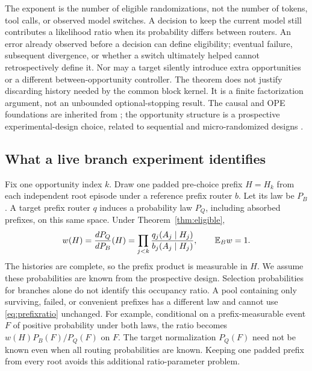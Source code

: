The exponent is the number of eligible randomizations, not the number of tokens, tool calls, or observed model switches. A decision to keep the current model still contributes a likelihood ratio when its probability differs between routers. An error already observed before a decision can define eligibility; eventual failure, subsequent divergence, or whether a switch ultimately helped cannot retrospectively define it. Nor may a target silently introduce extra opportunities or a different between-opportunity controller. The theorem does not justify discarding history needed by the common block kernel. It is a finite factorization argument, not an unbounded optional-stopping result. The causal and OPE foundations are inherited from \citet{robins1986new,jiang2016dr}; the opportunity structure is a prospective experimental-design choice, related to sequential and micro-randomized designs \citep{murphy2005smart,klasnja2015mrt}.

\subsection{What a live branch experiment identifies}
\label{sec:branches}

Fix one opportunity index $k$. Draw one padded pre-choice prefix $H=H_k$ from each independent root episode under a reference prefix router $b$. Let its law be $P_B$. A target prefix router $q$ induces a probability law $P_Q$, including absorbed prefixes, on this same space. Under Theorem~\ref{thm:eligible},
\begin{equation}
 w(H)=\frac{dP_Q}{dP_B}(H)
 =\prod_{j<k}\frac{q_j(A_j\mid H_j)}{b_j(A_j\mid H_j)},
 \qquad \mathbb{E}_Bw=1.
 \label{eq:prefixratio}
\end{equation}
The histories are complete, so the prefix product is measurable in $H$. We assume these probabilities are known from the prospective design. Selection probabilities for branches alone do not identify this occupancy ratio. A pool containing only surviving, failed, or convenient prefixes has a different law and cannot use \eqref{eq:prefixratio} unchanged. For example, conditional on a prefix-measurable event $F$ of positive probability under both laws, the ratio becomes $w(H)P_B(F)/P_Q(F)$ on $F$. The target normalization $P_Q(F)$ need not be known even when all routing probabilities are known. Keeping one padded prefix from every root avoids this additional ratio-parameter problem.

